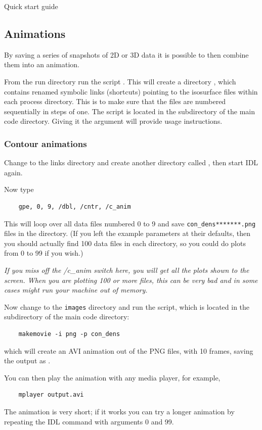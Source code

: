 \begin{chapter}{\label{cha:quickstart} Quick start guide}
  \subsection{Animations}
  By saving a series of snapshots of 2D or 3D data it is possible to then
  combine them into an animation.

  From the run directory run the script .  This will
  create a directory , which contains renamed symbolic links
  (shortcuts) pointing to the isosurface files within each process directory.
  This is to make sure that the files are numbered sequentially in steps of
  one.  The  script is located in the 
  subdirectory of the main code directory.  Giving it the argument
   will provide usage instructions.

  \subsubsection{Contour animations}
  Change to the links directory and create another directory called
  , then start IDL again.

  Now type
  \begin{Verbatim}
    gpe, 0, 9, /dbl, /cntr, /c_anim
  \end{Verbatim}
  This will loop over all data files numbered 0 to 9 and save
  \verb"con_dens*******.png" files in the  directory.  (If you
  left the  example parameters at their defaults, then you
  should actually find 100 data files in each  directory, so you
  could do plots from 0 to 99 if you wish.)

  \emph{If you miss off the /c\_anim switch here, you will get all the
  plots shown to the screen.  When you are plotting 100 or more files, this
  can be very bad and in some cases might run your machine out of memory.}

  Now change to the \verb"images" directory and run the 
  script, which is located in the  subdirectory of the main
  code directory:
  \begin{Verbatim}
    makemovie -i png -p con_dens
  \end{Verbatim}
  which will create an AVI animation out of the PNG files, with 10 frames,
  saving the output as .

  You can then play the animation with any media player, for example,
  \begin{Verbatim}
    mplayer output.avi
  \end{Verbatim}
  The animation is very short; if it works you can try a longer animation by
  repeating the  IDL command with arguments 0 and 99.


\end{chapter}
